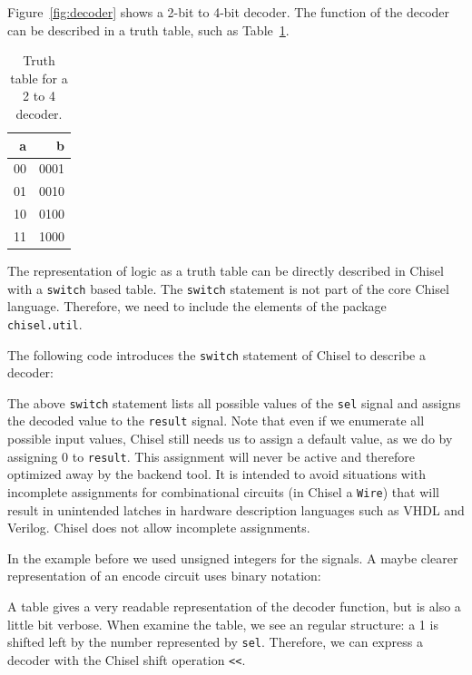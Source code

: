 \documentclass[%
    10pt,
    headinclude, footexclude,
    openright, %
    notitlepage,
    cleardoubleempty,
    headsepline,
    pointlessnumbers,
    bibtotoc, idxtotoc,
    ]{scrbook}
\newcommand{\code}[1]{{\small{\texttt{#1}}}}
\begin{document}
Figure~\ref{fig:decoder} shows a 2-bit to 4-bit decoder. The function of the decoder
can be described in a truth table, such as Table~\ref{tab:decoder}.

\begin{table}
 \centering
 \label{tab:decoder}
  \begin{tabular}{rr}
    \toprule
    a & b \\
    \midrule
    00 & 0001 \\
    01 & 0010 \\
    10 & 0100 \\
    11 & 1000 \\
    \bottomrule 
  \end{tabular} 
  \caption{Truth table for a 2 to 4 decoder.}
\end{table}

The representation of logic as a truth table can be directly described in Chisel with a
\code{switch} based table.
The \code{switch} statement is not part of the core Chisel language.
Therefore, we need to include the elements of the package \code{chisel.util}.


\noindent The following code introduces the \code{switch} statement of Chisel to describe a decoder:


\noindent The above \code{switch} statement lists all possible values of the \code{sel} signal
and assigns the decoded value to the \code{result} signal.
Note that even if we enumerate all possible input values, Chisel still needs us to assign a
default value, as we do by assigning 0 to \code{result}.
This assignment will never be active and therefore optimized away by the backend tool.
It is intended to avoid situations with incomplete assignments for combinational circuits
(in Chisel a \code{Wire}) that will result in unintended latches in hardware description
languages such as VHDL and Verilog. Chisel does not allow incomplete assignments.

In the example before we used unsigned integers for the signals. A maybe clearer representation
of an encode circuit uses binary notation:


A table gives a very readable representation of the decoder function, but is also
a little bit verbose.
When examine the table, we see an regular structure: a 1 is shifted left by the number
represented by \code{sel}. Therefore, we can express a decoder with the Chisel shift
operation \code{<<}.
\end{document}
